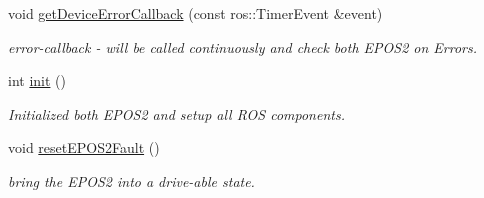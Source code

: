 \begin{DoxyCompactItemize}
void \hyperlink{classTankSteering_aed4cd5e319cd5c9cd95b835f1615eb0d}{get\-Device\-Error\-Callback} (const ros\-::\-Timer\-Event \&event)
\begin{DoxyCompactList}\small\item\em error-\/callback -\/ will be called continuously and check both E\-P\-O\-S2 on Errors. \end{DoxyCompactList}\item 
int \hyperlink{classTankSteering_a32596c18de1130cad7e926e3182f12c4}{init} ()
\begin{DoxyCompactList}\small\item\em Initialized both E\-P\-O\-S2 and setup all R\-O\-S components. \end{DoxyCompactList}\item 
void \hyperlink{classTankSteering_a99aadf750c50610cfea8732f95e21426}{reset\-E\-P\-O\-S2\-Fault} ()
\begin{DoxyCompactList}\small\item\em bring the E\-P\-O\-S2 into a drive-\/able state. \end{DoxyCompactList}\end{DoxyCompactItemize}
